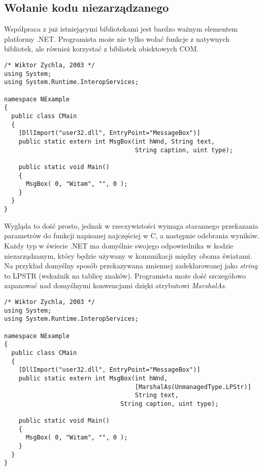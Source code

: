 \subsection{Wołanie kodu niezarządzanego}

Współpraca z już istniejącymi bibliotekami jest bardzo ważnym elementem platformy .NET. Programista
może nie tylko wołać funkcje z natywnych bibliotek, ale również korzystać z bibliotek obiektowych COM.

\begin{scriptsize}
\begin{verbatim}
/* Wiktor Zychla, 2003 */
using System;
using System.Runtime.InteropServices;

namespace NExample
{
  public class CMain
  {
    [DllImport("user32.dll", EntryPoint="MessageBox")]
    public static extern int MsgBox(int hWnd, String text, 
                                    String caption, uint type);

    public static void Main()
    {
      MsgBox( 0, "Witam", "", 0 );
    }
  }
}
\end{verbatim}
\end{scriptsize}

Wygląda to dość prosto, jednak w rzeczywistości wymaga starannego przekazania parametrów
do funkcji napisanej najczęściej w C, a następnie odebrania wyników. Każdy typ w świecie .NET ma 
domyślnie swojego odpowiednika w kodzie niezarządzanym, który będzie używany w komunikacji między oboma
światami. Na przykład domyślny sposób przekazywana zmiennej zadeklarowanej jako {\em string} to LPSTR
(wskaźnik na tablicę znaków). Programista może dość szczegółowo zapanować nad domyślnymi konwencjami dzięki
atrybutowi {\em MarshalAs}.

\begin{scriptsize}
\begin{verbatim}
/* Wiktor Zychla, 2003 */
using System;
using System.Runtime.InteropServices;

namespace NExample
{
  public class CMain
  {
    [DllImport("user32.dll", EntryPoint="MessageBox")]
    public static extern int MsgBox(int hWnd, 
                                    [MarshalAs(UnmanagedType.LPStr)]
                                    String text, 
	                            String caption, uint type);

    public static void Main()
    {
      MsgBox( 0, "Witam", "", 0 );
    }
  }
}
\end{verbatim}
\end{scriptsize}

